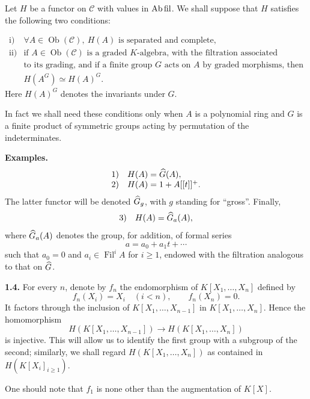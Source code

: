 \documentclass[11pt]{article}
\newcommand{\Fil}{\operatorname{Fil}}
\begin{document}
Let \(H\) be a functor on \(\mathcal C\) with values in \(\mathrm{Ab\,fil}\). We shall suppose that \(H\) satisfies the following two conditions:

\[
\begin{array}{ll}
\text{i)} & \forall A\in\operatorname{Ob}(\mathcal C),\ H(A)\text{ is separated and complete},\\[0.3em]
\text{ii)} & \text{if }A\in\operatorname{Ob}(\mathcal C)\text{ is a graded }K\text{-algebra, with the filtration associated}\\
&\text{to its grading, and if a finite group }G\text{ acts on }A\text{ by graded morphisms, then}\\
& H(A^G)\simeq H(A)^G .
\end{array}
\]
Here \(H(A)^G\) denotes the invariants under \(G\).

In fact we shall need these conditions only when \(A\) is a polynomial ring and \(G\) is a finite product of symmetric groups acting by permutation of the indeterminates.

\textbf{Examples.}
\[
\begin{array}{ll}
1)& H(A)=\widehat G(A),\\
2)& H(A)=1+A[[t]]^+.
\end{array}
\]
The latter functor will be denoted \(\widehat G_g\), with \(g\) standing for ``gross''. Finally,
\[
3)\quad H(A)=\widehat G_a(A),
\]
where \(\widehat G_a(A)\) denotes the group, for addition, of formal series
\[
  a=a_0+a_1t+\cdots
\]
such that \(a_0=0\) and \(a_i\in\Fil^i A\) for \(i\geq 1\), endowed with the filtration analogous to that on \(\widehat G\).

\textbf{1.4.} For every \(n\), denote by \(f_n\) the endomorphism of \(K[X_1,\ldots,X_n]\) defined by
\[
  f_n(X_i)=X_i\quad (i<n),\qquad f_n(X_n)=0.
\]
It factors through the inclusion of \(K[X_1,\ldots,X_{n-1}]\) in \(K[X_1,\ldots,X_n]\). Hence the homomorphism
\[
  H(K[X_1,\ldots,X_{n-1}])\longrightarrow H(K[X_1,\ldots,X_n])
\]
is injective. This will allow us to identify the first group with a subgroup of the second; similarly, we shall regard \(H(K[X_1,\ldots,X_n])\) as contained in \(H(K[X_i]_{i\geq 1})\).

One should note that \(f_1\) is none other than the augmentation of \(K[X]\).
\end{document}
